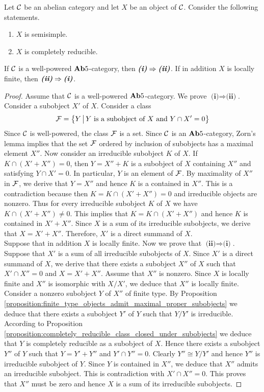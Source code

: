 \begin{theorem}
Let ${\mathcal C}$ be an abelian category and let $X$ be an object of ${\mathcal C}$. Consider the following statements.
\begin{enumerate}[label=\emph{\textbf{(\roman*)}}, leftmargin=1.5em]
\item $X$ is semisimple.
\item $X$ is completely reducible.
\end{enumerate}
If ${\mathcal C}$ is a well-powered $\mathbf{Ab}5$-category, then $\emph{\textbf{(i)}}\Rightarrow \emph{\textbf{(ii)}}$. If in addition $X$ is locally finite, then $\emph{\textbf{(ii)}} \Rightarrow \emph{\textbf{(i)}}$.
\end{theorem}
\begin{proof}
Assume that ${\mathcal C}$ is a well-powered $\mathbf{Ab}5$-category. We prove $\textbf{(i)}\Rightarrow \textbf{(ii)}$. Consider a subobject $X'$ of $X$. Consider a class
$${\mathcal F}=\big\{Y\,\big|\,Y\mbox{ is a subobject of }X\mbox{ and }Y\cap X' =0\big\}$$
Since ${\mathcal C}$ is well-powered, the class ${\mathcal F}$ is a set. Since ${\mathcal C}$ is an $\mathbf{Ab}5$-category, Zorn's lemma implies that the set ${\mathcal F}$ ordered by inclusion of subobjects has a maximal element $X''$. Now consider an irreducible subobject $K$ of $X$. If $K\cap (X'+X'')= 0$, then $Y = X'' + K$ is a subobject of $X$ containing $X''$ and satisfying $Y\cap X' = 0$. In particular, $Y$ is an element of ${\mathcal F}$. By maximality of $X''$ in ${\mathcal F}$, we derive that $Y = X''$ and hence $K$ is a contained in $X''$. This is a contradiction because then $K= K \cap (X' + X'') = 0$ and irreducible objects are nonzero. Thus for every irreducible subobject $K$ of $X$ we have $K\cap (X'+X'')\neq 0$. This implies that $K = K\cap (X'+X'')$ and hence $K$ is contained in $X'+X''$. Since $X$ is a sum of its irreducible subobjects, we derive that $X = X' + X''$. Therefore, $X'$ is a direct summand of $X$.\\
Suppose that in addition $X$ is locally finite. Now we prove that $\textbf{(ii)}\Rightarrow \textbf{(i)}$. Suppose that $X'$ is a sum of all irreducible subobjects of $X$. Since $X'$ is a direct summand of $X$, we derive that there exists a subobject $X''$ of $X$ such that $X'\cap X''=0$ and $X = X'+X''$. Assume that $X''$ is nonzero. Since $X$ is locally finite and $X''$ is isomorphic with $X/X'$, we deduce that $X''$ is locally finite. Consider a nonzero subobject $Y$ of $X''$ of finite type. By Proposition \ref{proposition:finite_type_objects_admit_maximal_proper_subobjects} we deduce that there exists a subobject $Y'$ of $Y$ such that $Y/Y'$ is irreducible. According to Proposition \ref{proposition:completely_reducible_class_closed_under_subobjects} we deduce that $Y$ is completely reducible as a subobject of $X$. Hence there exists a subobject $Y''$ of $Y$ such that $Y = Y' + Y''$ and $Y'\cap Y''=0$. Clearly $Y''\cong Y/Y'$ and hence $Y''$ is irreducible subobject of $Y$. Since $Y$ is contained in $X''$, we deduce that $X''$ admits an irreducible subobject. This is contradiction with $X'\cap X'' = 0$. This proves that $X''$ must be zero and hence $X$ is a sum of its irreducible subobjects.
\end{proof}


















\small



